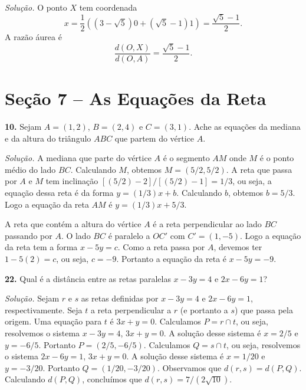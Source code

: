 \documentclass[a4paper,11pt]{article}
\begin{document}
\vspace{\baselineskip}

\emph{Solução.}
O ponto $X$ tem coordenada
\[
  x = \frac{1}{2} ( (3-\sqrt{5}) 0 + (\sqrt{5}-1) 1 ) = \frac{\sqrt{5}-1}{2}.
\]
A razão áurea é
\[
  \frac{d(O,X)}{d(O,A)} = \frac{\sqrt{5}-1}{2}.
\]

\vspace{\baselineskip}

\section*{Seção 7 -- As Equações da Reta}

\textbf{10.}
Sejam $A = (1,2)$, $B = (2,4)$ e $C = (3,1)$.
Ache as equações da mediana e da altura do triângulo $ABC$ que partem do vértice $A$.

\vspace{\baselineskip}

\emph{Solução.}
A mediana que parte do vértice $A$ é o segmento $AM$ onde $M$ é o ponto médio do lado $BC$.
Calculando $M$, obtemos $M = (5/2,5/2)$.
A reta que passa por $A$ e $M$ tem inclinação $[(5/2)-2]/[(5/2)-1] = 1/3$, ou seja, a equação dessa reta é da forma $y = (1/3)x + b$.
Calculando $b$, obtemos $b = 5/3$.
Logo a equação da reta $AM$ é $y = (1/3)x + 5/3$.

A reta que contém a altura do vértice $A$ é a reta perpendicular ao lado $BC$ passando por $A$.
O lado $BC$ é paralelo a $OC'$ com $C' = (1,-5)$.
Logo a equação da reta tem a forma $x - 5y = c$.
Como a reta passa por $A$, devemos ter $1-5(2) = c$, ou seja, $c = -9$.
Portanto a equação da reta é $x - 5y = -9$.

\vspace{\baselineskip}

\textbf{22.}
Qual é a distância entre as retas paralelas $x - 3y = 4$ e $2x - 6y = 1$?

\vspace{\baselineskip}

\emph{Solução.}
Sejam $r$ e $s$ as retas definidas por $x - 3y = 4$ e $2x - 6y = 1$, respectivamente.
Seja $t$ a reta perpendicular a $r$ (e portanto a $s$) que passa pela origem.
Uma equação para $t$ é $3x + y = 0$.
Calculamos $P = r \cap t$, ou seja, resolvemos o sistema $x-3y = 4$, $3x + y = 0$.
A solução desse sistema é $x = 2/5$ e $y = -6/5$.
Portanto $P = (2/5, -6/5)$.
Calculamos $Q = s \cap t$, ou seja, resolvemos o sistema $2x - 6y = 1$, $3x + y = 0$.
A solução desse sistema é $x = 1/20$ e $y = -3/20$.
Portanto $Q = (1/20, -3/20)$.
Observamos que $d(r,s) = d(P,Q)$.
Calculando $d(P,Q)$, concluímos que
$d(r,s) = 7/(2 \sqrt{10})$.
\end{document}
